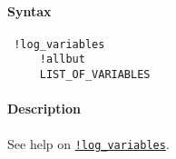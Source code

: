 


	\paragraph{Syntax}
 
 \begin{verbatim}
 !log_variables
     !allbut
     LIST_OF_VARIABLES
 \end{verbatim}
 
 \paragraph{Description}
 
 See help on \href{modellang/logvariables}{\texttt{!log\_variables}}.


